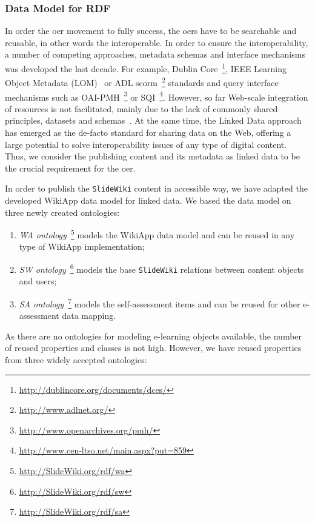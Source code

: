 \documentclass[PhD, Submit, ngerman,UKenglish,table]{scrbook}
\begin{document}
 

\subsubsection{Data Model for RDF}
\label{sec:data_model_rdf}

In order the \gls{oer} movement to fully success, the \gls{oer}s have to be searchable and reusable, in other words the interoperable.
In order to ensure the interoperability, a number of competing approaches, metadata schemas and interface mechanisms was developed the last decade. 
For example, Dublin Core~\footnote{\url{http://dublincore.org/documents/dces/}}, IEEE Learning Object Metadata (LOM)~\cite{learning2002ieee} or ADL \gls{scorm}~\footnote{\url{http://www.adlnet.org/}} standards and query interface mechanisms such as OAI-PMH~\footnote{\url{http://www.openarchives.org/pmh/}} or SQI~\footnote{\url{http://www.cen-ltso.net/main.aspx?put=859}}.
However, so far Web-scale integration of resources is not facilitated, mainly due to the lack of commonly shared principles, datasets and schemas~\cite{Dietze:2012:LEI:2245276.2245347}.
At the same time, the Linked Data approach has emerged as the de-facto standard for sharing data on the Web, offering a large potential to solve interoperability issues of any type of digital content.
Thus, we consider the publishing content and its metadata as linked data to be the crucial requirement for the \gls{oer}.

In order to publish the \texttt{SlideWiki} content in accessible way, we have adapted the developed WikiApp data model for linked data. 
We based the data model on three newly created ontologies: 
\begin{enumerate}
\item \emph{WA ontology}~\footnote{\url{http://SlideWiki.org/rdf/wa}} models the WikiApp data model and can be reused in any type of WikiApp implementation; 
\item \emph{SW ontology}~\footnote{\url{http://SlideWiki.org/rdf/sw}} models the base \texttt{SlideWiki} relations between content objects and users; 
\item \emph{SA ontology}~\footnote{\url{http://SlideWiki.org/rdf/sa}} models the self-assessment items and can be reused for other e-assessment data mapping.
\end{enumerate}

As there are no ontologies for modeling e-learning objects available, the number of reused properties and classes is not high.
However, we have reused properties from three widely accepted ontologies: 
\end{document}
